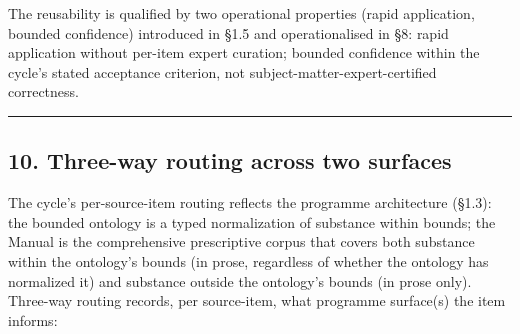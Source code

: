 \documentclass[
]{article}
\begin{document}
The reusability is qualified by two operational properties (rapid
application, bounded confidence) introduced in §1.5 and operationalised
in §8: rapid application without per-item expert curation; bounded
confidence within the cycle's stated acceptance criterion, not
subject-matter-expert-certified correctness.

\begin{center}\rule{0.5\linewidth}{0.5pt}\end{center}

\subsection{10. Three-way routing across two
surfaces}\label{three-way-routing-across-two-surfaces}

The cycle's per-source-item routing reflects the programme architecture
(§1.3): the bounded ontology is a typed normalization of substance
within bounds; the Manual is the comprehensive prescriptive corpus that
covers both substance within the ontology's bounds (in prose, regardless
of whether the ontology has normalized it) and substance outside the
ontology's bounds (in prose only). Three-way routing records, per
source-item, what programme surface(s) the item informs:
\end{document}
